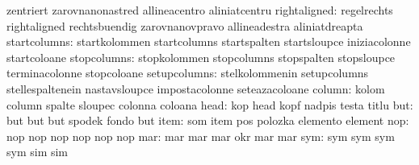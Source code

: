                                   zentriert                        zarovnanonastred
                                  allineacentro                    aliniatcentru
                    rightaligned: regelrechts                      rightaligned
                                  rechtsbuendig                    zarovnanovpravo
                                  allineadestra                    aliniatdreapta
                    startcolumns: startkolommen                    startcolumns
                                  startspalten                     startsloupce
                                  iniziacolonne                    startcoloane
                     stopcolumns: stopkolommen                     stopcolumns
                                  stopspalten                      stopsloupce
                                  terminacolonne                   stopcoloane
                    setupcolumns: stelkolommenin                   setupcolumns
                                  stellespaltenein                 nastavsloupce
                                  impostacolonne                   seteazacoloane
                          column: kolom                            column
                                  spalte                           sloupec
                                  colonna                          coloana
                            head: kop                              head
                                  kopf                             nadpis
                                  testa                            titlu %
                             but: but                              but
                                  but                              spodek
                                  fondo                            but
                            item: som                              item
                                  pos                              polozka
                                  elemento                         element
                             nop: nop                              nop
                                  nop                              nop
                                  nop                              nop
                             mar: mar                              mar
                                  mar                              okr
                                  mar                              mar
                             sym: sym                              sym
                                  sym                              sym
                                  sim                              sim

